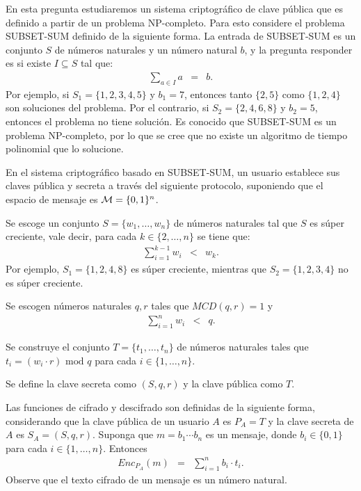 
En esta pregunta estudiaremos un sistema criptográfico de clave pública que es definido a partir de un problema NP-completo. Para esto considere el problema SUBSET-SUM definido de la siguiente forma. La entrada de SUBSET-SUM es un conjunto $S$ de números naturales y un número natural $b$, y la pregunta responder es si existe $I \subseteq S$ tal que:
\begin{eqnarray*}
  \sum_{a \in I} a &=& b.
\end{eqnarray*}
Por ejemplo, si $S_1 = \{1, 2, 3, 4, 5\}$ y $b_1 = 7$, entonces tanto $\{2, 5\}$ como $\{1 ,2, 4\}$ son soluciones del problema. Por el contrario, si $S_2 = \{2, 4, 6, 8\}$ y $b_2 = 5$, entonces el problema no tiene solución. Es conocido que SUBSET-SUM es un problema NP-completo, por lo que se cree que no existe un algoritmo de tiempo polinomial que lo solucione.

En el sistema criptográfico basado en SUBSET-SUM, un usuario establece sus claves pública y secreta a través del siguiente protocolo, suponiendo que el espacio de mensaje es \mbox{${\cal M} = \{0,1\}^n$}.
\begin{enumerate}
\item[(1)] Se escoge un conjunto $S = \{w_1, \ldots, w_n\}$ de números naturales tal que $S$ es súper creciente, vale decir, para cada $k \in \{2, \ldots, n\}$ se tiene que:
  \begin{eqnarray*}
    \sum_{i = 1}^{k-1} w_i &<& w_k.
  \end{eqnarray*}
  Por ejemplo, $S_1 = \{1, 2, 4, 8\}$ es súper creciente, mientras que $S_2 = \{1, 2, 3, 4\}$ no es súper creciente.


\item[(2)] Se escogen números naturales $q, r$ tales que $\textit{MCD}(q, r) = 1$ y 
  \begin{eqnarray*}
    \sum_{i=1}^n w_i &<& q.
  \end{eqnarray*}

  \begin{sloppypar}
\item[(3)] Se construye el conjunto $T = \{t_1, \ldots, t_n\}$ de números naturales tales que \mbox{$t_i = (w_i \cdot r) \text{ mod } q$} para cada $i \in \{1, \ldots, n\}$.
  \end{sloppypar}
 
\item[(4)] Se define la clave secreta como $(S,q,r)$ y la clave pública como $T$.
\end{enumerate}
Las funciones de cifrado y descifrado son definidas de la siguiente forma, considerando que la clave pública de un usuario $A$ es $P_A = T$ y la clave secreta de $A$ es $S_A = (S,q,r)$. Suponga que $m = b_1 \cdots b_n$ es un mensaje, donde $b_i \in \{0,1\}$ para cada $i \in \{1, \ldots, n\}$. Entonces
\begin{eqnarray*}
  \textit{Enc}_{P_A}(m) &=& \sum_{i = 1}^n b_i \cdot t_i.
\end{eqnarray*}
Observe que el texto cifrado de un mensaje es un número natural.

